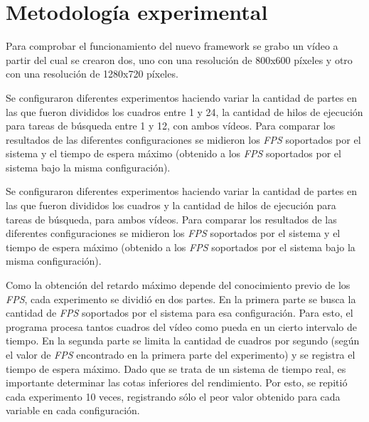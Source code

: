 
\section{Metodología experimental}

\label{metodologiaExperimental}

Para comprobar el funcionamiento del nuevo framework se grabo un vídeo a partir
del cual se crearon dos, uno con una resolución de 800x600 píxeles y otro con
una resolución de 1280x720 píxeles.

Se configuraron diferentes experimentos haciendo variar la cantidad de partes en
las que fueron divididos los cuadros entre 1 y 24, la cantidad de hilos de
ejecución para tareas de búsqueda entre 1 y 12, con ambos vídeos. Para comparar
los resultados de las diferentes configuraciones se midieron los \emph{FPS}
soportados por el sistema y el tiempo de espera máximo (obtenido a los
\emph{FPS} soportados por el sistema bajo la misma configuración).

Se configuraron diferentes experimentos haciendo variar la cantidad de partes en
las que fueron divididos los cuadros y la cantidad de hilos de ejecución para
tareas de búsqueda, para ambos vídeos. Para comparar los resultados de las
diferentes configuraciones se midieron los \emph{FPS} soportados por el sistema
y el tiempo de espera máximo (obtenido a los \emph{FPS} soportados por el
sistema bajo la misma configuración).

Como la obtención del retardo máximo depende del conocimiento previo de los
\emph{FPS}, cada experimento se dividió en dos partes. En la primera parte se
busca la cantidad de \emph{FPS} soportados por el sistema para esa
configuración. Para esto, el programa procesa tantos cuadros del vídeo como
pueda en un cierto intervalo de tiempo. En la segunda parte se limita la
cantidad de cuadros por segundo (según el valor de \emph{FPS} encontrado en la
primera parte del experimento) y se registra el tiempo de espera máximo. Dado
que se trata de un sistema de tiempo real, es importante determinar las cotas
inferiores del rendimiento. Por esto, se repitió cada experimento 10 veces,
registrando sólo el peor valor obtenido para cada variable en cada
configuración.

